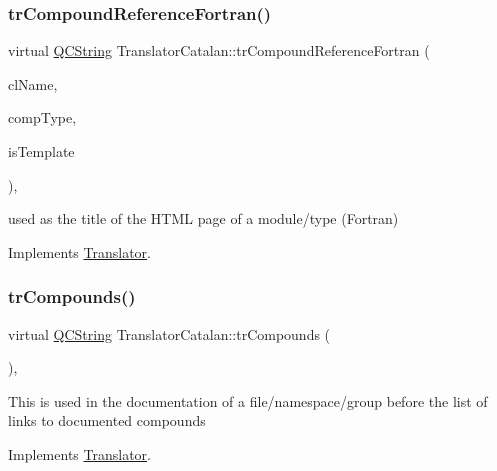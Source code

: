 \subsubsection{\texorpdfstring{trCompoundReferenceFortran()}{trCompoundReferenceFortran()}}
{\footnotesize\ttfamily virtual \mbox{\hyperlink{class_q_c_string}{Q\+C\+String}} Translator\+Catalan\+::tr\+Compound\+Reference\+Fortran (\begin{DoxyParamCaption}\item[{const char $\ast$}]{cl\+Name,  }\item[{\mbox{\hyperlink{class_class_def_ae70cf86d35fe954a94c566fbcfc87939}{Class\+Def\+::\+Compound\+Type}}}]{comp\+Type,  }\item[{bool}]{is\+Template }\end{DoxyParamCaption})\hspace{0.3cm}{\ttfamily [inline]}, {\ttfamily [virtual]}}

used as the title of the H\+T\+ML page of a module/type (Fortran) 

Implements \mbox{\hyperlink{class_translator}{Translator}}.

\mbox{\label{class_translator_catalan_ac76367de3457fecbc4ce38aa8e225626}} 
\subsubsection{\texorpdfstring{trCompounds()}{trCompounds()}}
{\footnotesize\ttfamily virtual \mbox{\hyperlink{class_q_c_string}{Q\+C\+String}} Translator\+Catalan\+::tr\+Compounds (\begin{DoxyParamCaption}{ }\end{DoxyParamCaption})\hspace{0.3cm}{\ttfamily [inline]}, {\ttfamily [virtual]}}

This is used in the documentation of a file/namespace/group before the list of links to documented compounds 

Implements \mbox{\hyperlink{class_translator}{Translator}}.

\mbox{\label{class_translator_catalan_aa1a34e106308a0d3b4a2fd24f3b2ed10}} 
